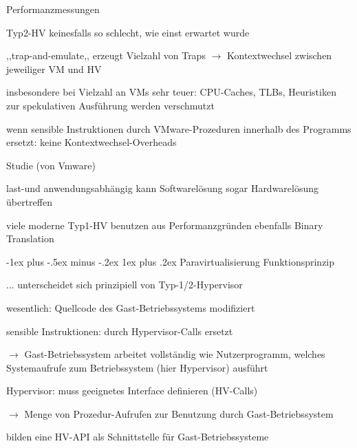 \documentclass[a4paper]{article}
\makeatletter
\renewcommand{\subsubsection}{\@startsection{subsubsection}{3}{0mm}%
 {-1ex plus -.5ex minus -.2ex}%
 {1ex plus .2ex}%
 {\normalfont\small\bfseries}}
\makeatother
\begin{document}
\begin{multicols}{3}
    Performanzmessungen
    \begin{itemize*}
        \item Typ2-HV keinesfalls so schlecht, wie einst erwartet wurde
        \item ,,trap-and-emulate,, erzeugt Vielzahl von Traps $\rightarrow$ Kontextwechsel zwischen jeweiliger VM und HV
        \item insbesondere bei Vielzahl an VMs sehr teuer: CPU-Caches, TLBs, Heuristiken zur spekulativen Ausführung werden verschmutzt
        \item wenn sensible Instruktionen durch VMware-Prozeduren innerhalb des Programms ersetzt: keine Kontextwechsel-Overheads
    \end{itemize*}

    Studie (von Vmware)
    \begin{itemize*}
        \item last-und anwendungsabhängig kann Softwarelösung sogar Hardwarelösung übertreffen
        \item viele moderne Typ1-HV benutzen aus Performanzgründen ebenfalls Binary Translation
    \end{itemize*}

    \subsubsection{Paravirtualisierung}
    Funktionsprinzip
    \begin{itemize*}
        \item ... unterscheidet sich prinzipiell von Typ-1/2-Hypervisor
        \item wesentlich: Quellcode des Gast-Betriebssystems modifiziert
        \item sensible Instruktionen: durch Hypervisor-Calls ersetzt
        \item[$\rightarrow$] Gast-Betriebssystem arbeitet vollständig wie Nutzerprogramm, welches Systemaufrufe zum Betriebssystem (hier Hypervisor) ausführt
        \item Hypervisor: muss geeignetes Interface definieren (HV-Calls)
        \item[$\rightarrow$] Menge von Prozedur-Aufrufen zur Benutzung durch Gast-Betriebssystem
        \item bilden eine HV-API als Schnittstelle für Gast-Betriebssysteme
    \end{itemize*}


\end{multicols}
\end{document}
